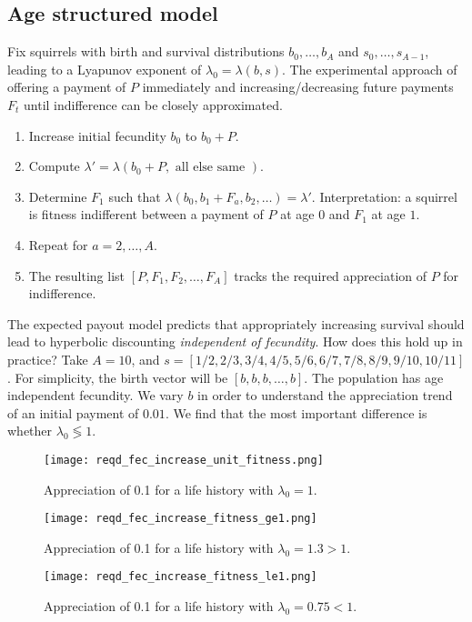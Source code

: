 \subsection{Age structured model}
Fix squirrels with  birth and survival distributions $b_0, \ldots, b_A$ and $s_0, \ldots, s_{A-1}$, leading to a Lyapunov exponent
of $\lambda_0 = \lambda(b, s)$. The experimental approach of offering a payment of $P$ immediately and increasing/decreasing future payments $F_t$ until
indifference can be closely approximated.
\begin{enumerate}
    \item Increase initial fecundity $b_0$ to $b_0 + P$. 
    \item Compute $\lambda' = \lambda(b_0 + P, \text{ all else same }) $. 
    \item Determine $F_1$ such that $\lambda(b_0, b_1 + F_a, b_2, \ldots) = \lambda'$. Interpretation: a squirrel is fitness
        indifferent between a payment of $P$ at age $0$ and $F_1$ at age $1$.
    \item Repeat for $a = 2, \ldots, A$. 
    \item The resulting list $\left[ P, F_1, F_2, \ldots, F_A \right]$ tracks the required appreciation of $P$ for indifference.
\end{enumerate}
The expected payout model predicts that appropriately increasing survival should lead to hyperbolic discounting \textit{
independent of fecundity}. How does this hold up in practice?
Take $A = 10$, and $s = [1/2, 2/3, 3/4, 4/5, 5/6, 6/7, 7/8, 8/9, 9/10, 10/11]$. For simplicity, the birth vector
will be $\left[ b, b, b, \ldots, b \right]$. The population has age independent fecundity. We vary $b$ in order to understand
the appreciation trend of an initial payment of $0.01$. We find that the most important difference is whether $\lambda_0 \lessgtr  1$. 
\begin{figure}[H]
    \centering
    \texttt{[image: reqd\_fec\_increase\_unit\_fitness.png]}
    \caption{Appreciation of 0.1 for a life history with $\lambda_0 = 1$.}
\end{figure}
\begin{figure}[H]
    \centering
    \texttt{[image: reqd\_fec\_increase\_fitness\_ge1.png]}
    \caption{Appreciation of 0.1 for a life history with $\lambda_0 = 1.3 > 1$.}
\end{figure}
\begin{figure}[H]
    \centering
    \texttt{[image: reqd\_fec\_increase\_fitness\_le1.png]}
    \caption{Appreciation of 0.1 for a life history with $\lambda_0 = 0.75 < 1$.}
\end{figure}
